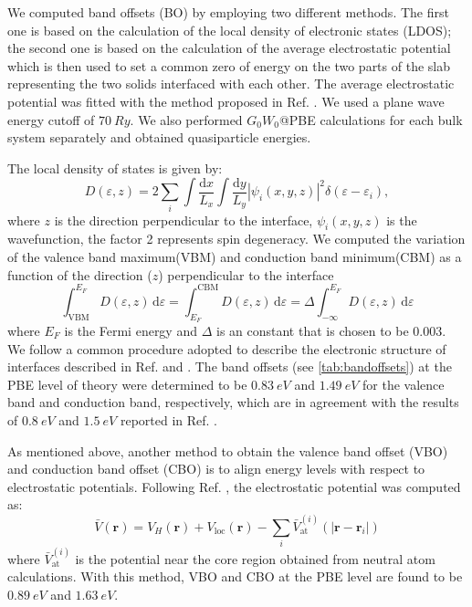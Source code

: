 \documentclass[aip,preprint]{revtex4-1}
\begin{document}
	We computed band offsets (BO) by employing two different methods. The first one is based on the calculation of the local density of electronic states (LDOS);\cite{Anh2013interface,LDOS_cited_by_Anh} the second one is based on the calculation of the average electrostatic potential which is then used to set a common zero of energy on the two parts of the slab representing the two solids interfaced with each other.\cite{Walle_alignment_by_potential} The average electrostatic potential was fitted with the method proposed in Ref. . We used a plane wave energy cutoff of $\SI{70}{\si{Ry}}$. We also performed $G_0W_0$@PBE calculations for each bulk system separately and obtained quasiparticle energies.

	The local density of states is given by:
	\begin{equation}
		D(\varepsilon,z) = 2\sum_i\int\frac{\mathrm{d}x}{L_x}\int\frac{\mathrm{d}y}{L_y} |\psi_i(x,y,z)|^2\delta(\varepsilon-\varepsilon_i),
	\end{equation}
	where $z$ is the direction perpendicular to the interface, $\psi_i(x,y,z)$ is the wavefunction, the factor 2 represents spin degeneracy. We computed the variation of the valence band maximum(VBM) and conduction band minimum(CBM) as a function of the direction ($z$) perpendicular to the interface\cite{Anh2013interface}
	\begin{equation}
		\int_\mathrm{VBM}^{E_F} D(\varepsilon,z)\,\mathrm{d}\varepsilon = \int_{E_F}^\mathrm{CBM}D(\varepsilon,z)\,\mathrm{d}\varepsilon = \Delta \int_{-\infty}^{E_F}D(\varepsilon,z)\,\mathrm{d}\varepsilon
	\end{equation}
	where $E_F$ is the Fermi energy and $\Delta$ is an constant that is chosen to be $0.003$.\cite{Anh2013interface} We follow a common procedure adopted to describe the electronic structure of interfaces described in Ref.  and .
 The band offsets (see \autoref{tab:bandoffsets}) at the PBE level of theory were determined to be $\SI{0.83}{\si{eV}}$ and $\SI{1.49}{\si{eV}}$ for the valence band and conduction band, respectively, which are in agreement with the results of $\SI{0.8}{\si{eV}}$ and $\SI{1.5}{\si{eV}}$ reported in Ref. .

	As mentioned above, another method to obtain the valence band offset (VBO) and conduction band offset (CBO) is to align energy levels with respect to electrostatic potentials. Following Ref. , the electrostatic potential was computed as:
	\begin{equation}
		\bar{V}(\mathbf{r}) = V_H(\mathbf{r}) + V_\mathrm{loc}(\mathbf{r}) - \sum_i\bar{V}_\mathrm{at}^{(i)}(|\mathbf{r}-\mathbf{r}_i|)
	\end{equation}
	where $\bar{V}_\mathrm{at}^{(i)}$ is the potential near the core region obtained from neutral atom calculations. With this method, VBO and CBO at the PBE level are found to be $\SI{0.89}{\si{eV}}$ and $\SI{1.63}{\si{eV}}$.
	
\end{document}

